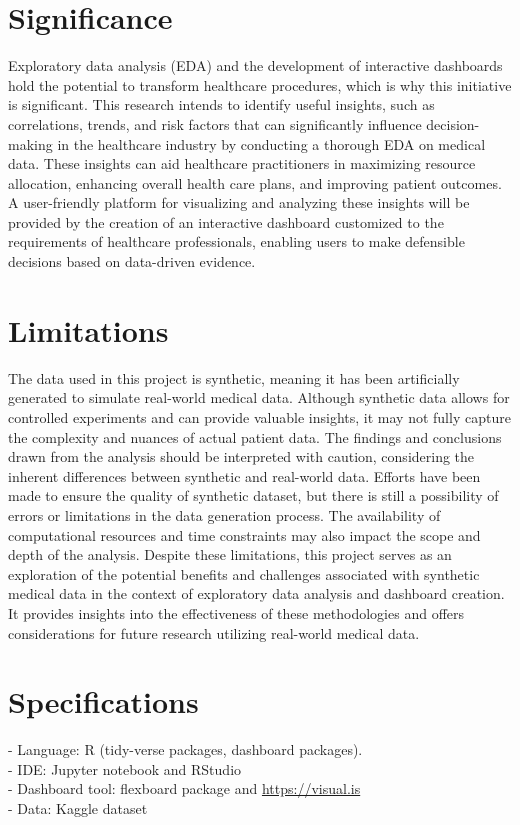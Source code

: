 \section{\bf Significance}
Exploratory data analysis (EDA) and the development of interactive dashboards hold the potential to transform healthcare procedures, which is why this initiative is significant. This research intends to identify useful insights, such as correlations, trends, and risk factors that can significantly influence decision-making in the healthcare industry by conducting a thorough EDA on medical data. These insights can aid healthcare practitioners in maximizing resource allocation, enhancing overall health care plans, and improving patient outcomes. A user-friendly platform for visualizing and analyzing these insights will be provided by the creation of an interactive dashboard customized to the requirements of healthcare professionals, enabling users to make defensible decisions based on data-driven evidence.



\section{\bf Limitations}
The data used in this project is synthetic, meaning it has been artificially generated to simulate real-world medical data. Although synthetic data allows for controlled experiments and can provide valuable insights, it may not fully capture the complexity and nuances of actual patient data. The findings and conclusions drawn from the analysis should be interpreted with caution, considering the inherent differences between synthetic and real-world data. Efforts have been made to ensure the quality of synthetic dataset, but there is still a possibility of errors or limitations in the data generation process. The availability of computational resources and time constraints may also impact the scope and depth of the analysis. Despite these limitations, this project serves as an exploration of the potential benefits and challenges associated with synthetic medical data in the context of exploratory data analysis and dashboard creation. It provides insights into the effectiveness of these methodologies and offers considerations for future research utilizing real-world medical data.

\section{\bf Specifications}
-  Language: R (tidy-verse packages, dashboard packages).\\
-  IDE: Jupyter notebook and RStudio\\
-  Dashboard tool: flexboard package and \url{https://visual.is}\\
-  Data: Kaggle dataset\\

